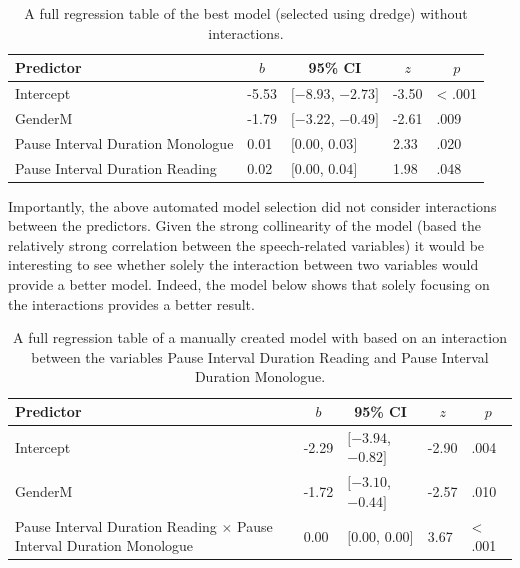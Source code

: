 \documentclass[
  english,
  doc,floatsintext]{apa6}
\begin{document}
\begin{table}[tbp]

\begin{center}
\begin{threeparttable}

\caption{\label{tab:table-best-model-dredge}A full regression table of the best model (selected using dredge) without interactions.}

\begin{tabular}{lllll}
\toprule
Predictor & \multicolumn{1}{c}{$b$} & \multicolumn{1}{c}{95\% CI} & \multicolumn{1}{c}{$z$} & \multicolumn{1}{c}{$p$}\\
\midrule
Intercept & -5.53 & $[-8.93$, $-2.73]$ & -3.50 & < .001\\
GenderM & -1.79 & $[-3.22$, $-0.49]$ & -2.61 & .009\\
Pause Interval Duration Monologue & 0.01 & $[0.00$, $0.03]$ & 2.33 & .020\\
Pause Interval Duration Reading & 0.02 & $[0.00$, $0.04]$ & 1.98 & .048\\
\bottomrule
\end{tabular}

\end{threeparttable}
\end{center}

\end{table}

Importantly, the above automated model selection did not consider interactions between the predictors.
Given the strong collinearity of the model (based the relatively strong correlation between the speech-related
variables) it would be interesting to see whether solely the interaction between two variables would provide
a better model. Indeed, the model below shows that solely focusing on the interactions provides a better result.

\begin{table}[tbp]

\begin{center}
\begin{threeparttable}

\caption{\label{tab:interaction-model}A full regression table of a manually created model with based on an interaction between the variables Pause Interval Duration Reading and Pause Interval Duration Monologue.}

\begin{tabular}{lllll}
\toprule
Predictor & \multicolumn{1}{c}{$b$} & \multicolumn{1}{c}{95\% CI} & \multicolumn{1}{c}{$z$} & \multicolumn{1}{c}{$p$}\\
\midrule
Intercept & -2.29 & $[-3.94$, $-0.82]$ & -2.90 & .004\\
GenderM & -1.72 & $[-3.10$, $-0.44]$ & -2.57 & .010\\
Pause Interval Duration Reading $\times$ Pause Interval Duration Monologue & 0.00 & $[0.00$, $0.00]$ & 3.67 & < .001\\
\bottomrule
\end{tabular}

\end{threeparttable}
\end{center}

\end{table}
\end{document}

